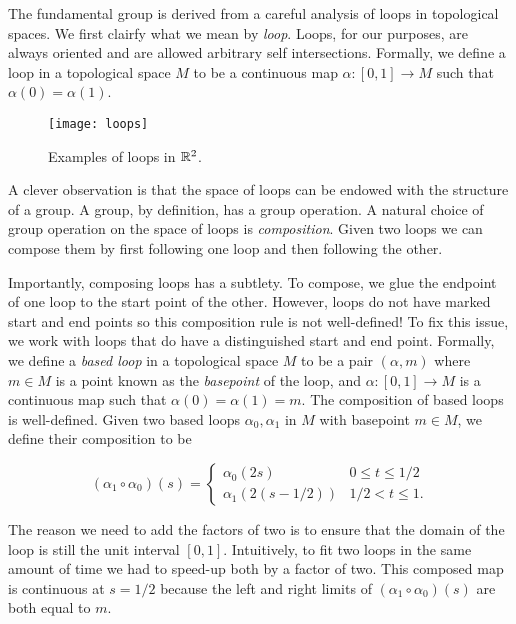 The fundamental group is derived from a careful analysis of loops in topological spaces. We first clairfy what we mean by \textit{loop}. Loops, for our purposes, are always oriented and are allowed arbitrary self intersections. Formally, we define a loop in a topological space $M$ to be a continuous map $\alpha:[0,1]\to M$ such that $\alpha(0)=\alpha(1)$.

\begin{figure}
\begin{center}
\texttt{[image: loops]}
\caption{Examples of loops in $\mathbb{R}^2$.}
\label{fig:loops}
\end{center}
\end{figure}

A clever observation is that the space of loops can be endowed with the structure of a group. A group, by definition, has a group operation. A natural choice of group operation on the space of loops is \textit{composition}. Given two loops we can compose them by first following one loop and then following the other.

Importantly, composing loops has a subtlety. To compose, we glue the endpoint of one loop to the start point of the other. However, loops do not have marked start and end points so this composition rule is not well-defined! To fix this issue, we work with loops that do have a distinguished start and end point. Formally, we define a \textit{based loop} in a topological space $M$ to be a pair $(\alpha,m)$ where $m\in M$ is a point known as the \textit{basepoint} of the loop, and $\alpha:[0,1]\to M$ is a continuous map such that $\alpha(0)=\alpha(1)=m$. The composition of based loops is well-defined. Given two based loops $\alpha_0,\alpha_1$ in $M$ with basepoint $m\in M$, we define their composition to be

$$
(\alpha_1 \circ \alpha_0)(s)=
\begin{cases}
\alpha_0(2s) & 0\leq t \leq 1/2 \\
\alpha_1(2(s-1/2)) & 1/2 < t \leq 1.
\end{cases}$$

The reason we need to add the factors of two is to ensure that the domain of the loop is still the unit interval $[0,1]$. Intuitively, to fit two loops in the same amount of time we had to speed-up both by a factor of two. This composed map is continuous at $s=1/2$ because the left and right limits of $(\alpha_1 \circ \alpha_0)(s)$ are both equal to $m$.

